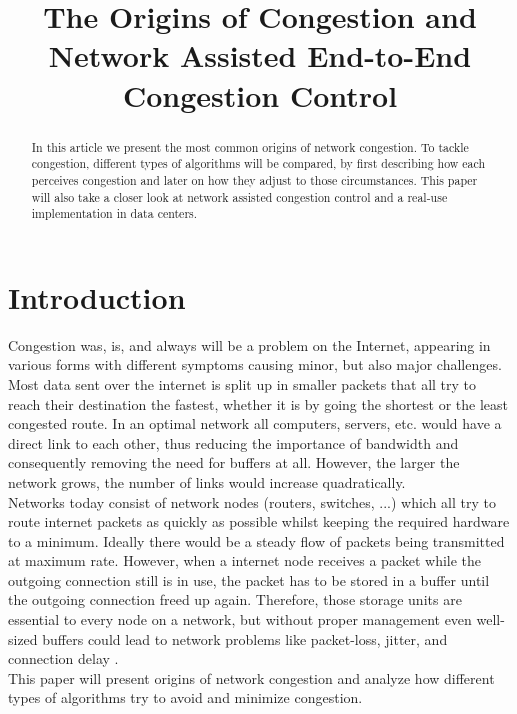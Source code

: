 \documentclass[a4paper,conference]{IEEEtran}
\begin{document}
\title{The Origins of Congestion and\\Network Assisted End-to-End Congestion Control}


\author{
}


\maketitle
\IEEEpeerreviewmaketitle

\begin{abstract}
In this article we present the most common origins of network congestion. To tackle congestion, different types of algorithms will be compared, by first describing how each perceives congestion and later on how they adjust to those circumstances. This paper will also take a closer look at network assisted congestion control and a real-use implementation in data centers.
\end{abstract}

\section{Introduction}
Congestion was, is, and always will be a problem on the Internet, appearing in various forms with different symptoms causing minor, but also major challenges. Most data sent over the internet is split up in smaller packets that all try to reach their destination the fastest, whether it is by going the shortest or the least congested route. In an optimal network all computers, servers, etc. would have a direct link to each other, thus reducing the importance of bandwidth and  consequently removing the need for buffers at all. However, the larger the network grows, the number of links would increase quadratically.
\\Networks today consist of network nodes (routers, switches, ...) which all try to route internet packets as quickly as possible whilst keeping the required hardware to a minimum. Ideally there would be a steady flow of packets being transmitted at maximum rate. However, when a internet node receives a packet while the outgoing connection still is in use, the packet has to be stored in a buffer until the outgoing connection freed up again. Therefore, those storage units are essential to every node on a network, but without proper management even well-sized buffers could lead to network problems like packet-loss, jitter, and connection delay \cite{appenzeller2004sizing}.
\\This paper will present origins of network congestion and analyze how different types of algorithms try to avoid and minimize congestion.
\end{document}
